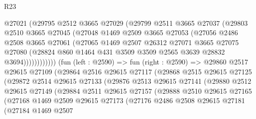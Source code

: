 \begin{lexlean}{R23}
\begin{coremodule}
                  @27021
                  (@29795
                    @2512
                    @3665
                    @27029
                    (@29799
                      @2511
                      @3665
                      @27037
                      (@29803
                        @2510
                        @3665
                        @27045
                        (@27048
                          @1469
                          @2509
                          @3665
                          @27053
                          (@27056
                            @2486
                            @2508
                            @3665
                            @27061
                            (@27065
                              @1469
                              @2507
                              @26312
                              @27071
                              @3665
                              @27075
                              @27080
                              (@28824
                                @860
                                @1464
                                @431
                                @3509
                                @3509
                                @2565
                                @3639
                                @28832
                                @3694))))))))))))
        (fun (left : @2590) =>
        fun (right : @2590) =>
        @29860
          @2517
          @29615
          @27109
          (@29864
            @2516
            @29615
            @27117
            (@29868
              @2515
              @29615
              @27125
              (@29872
                @2514
                @29615
                @27133
                (@29876
                  @2513
                  @29615
                  @27141
                  (@29880
                    @2512
                    @29615
                    @27149
                    (@29884
                      @2511
                      @29615
                      @27157
                      (@29888
                        @2510
                        @29615
                        @27165
                        (@27168
                          @1469
                          @2509
                          @29615
                          @27173
                          (@27176
                            @2486
                            @2508
                            @29615
                            @27181
                            (@27184
                              @1469
                              @2507

\end{coremodule}
\end{lexlean}
